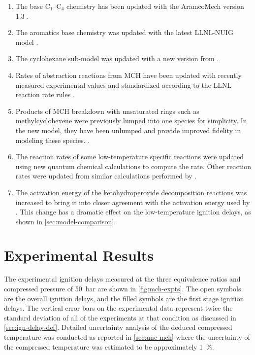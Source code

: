 \documentclass[../main.tex]{subfiles}
\begin{document}
\begin{enumerate}
    \item The base C$_1$--C$_4$ chemistry has been updated with the AramcoMech
        version 1.3 \cite{Metcalfe2013}.
    \item The aromatics base chemistry was updated with the latest LLNL-NUIG
        model \cite{Nakamura2014}.
    \item The cyclohexane sub-model was updated with a new version from
        \textcite{Silke2007}.
    \item Rates of abstraction reactions from MCH have been updated
        with recently measured experimental values \cite{Sivaramakrishnan2009}
        and standardized according to the LLNL reaction rate rules \cite{Sarathy2011b}.
    \item Products of MCH breakdown with unsaturated rings such as
        methylcyclohexene were previously lumped into one species for
        simplicity. In the new model, they have been unlumped and
        provide improved fidelity in modeling these species. \cite{Pitz2013}.
    \item The reaction rates of some low-temperature specific reactions were
        updated using new quantum chemical calculations to compute the rate.
        Other reaction rates were updated from similar calculations performed
        by \textcite{Fernandes2009}.
    \item The activation energy of the ketohydroperoxide decomposition
        reactions was increased to bring it into closer agreement with
        the activation energy used by \textcite{Metcalfe2013}. This change
        has a dramatic effect on the low-temperature ignition delays, as shown
        in \cref{sec:model-comparison}.
\end{enumerate}

\section{Experimental Results}
\label{sec:mch-expts}

The experimental ignition delays measured at the three equivalence ratios and
compressed pressure of \SI{50}{\bar} are shown in \cref{fig:mch-expts}. The open symbols are the
overall ignition delays, and the filled symbols are the first stage ignition
delays. The vertical error bars on the experimental data represent twice the
standard deviation of all of the experiments at that condition as
discussed in \cref{sec:ign-delay-def}. Detailed uncertainty analysis of
the deduced compressed temperature was conducted as reported in
\cref{sec:unc-mch} where the uncertainty of the compressed
temperature was estimated to be approximately \SI{1}{\percent}.
\end{document}
